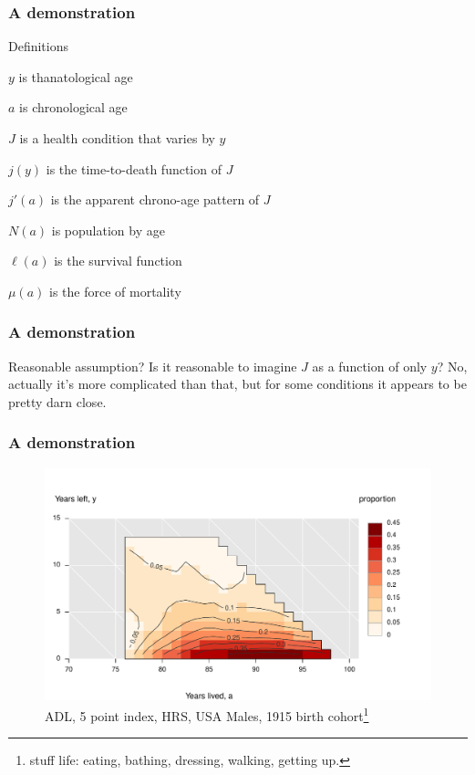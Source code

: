 \documentclass[20pt]{beamer}
\begin{document}
\begin{frame}
\frametitle{A demonstration}
\begin{block}{Definitions}
\begin{description}
\item{$y$} is thanatological age 
\item{$a$} is chronological age 
\item{$J$} is a health condition that varies by $y$~~~\footnotemark
\item{$j(y)$} is the time-to-death function of $J$
\item{$j'(a)$} is the apparent chrono-age pattern of $J$
\item{$N(a)$} is population by age
\item{$\ell(a)$} is the survival function
\item{$\mu(a)$} is the force of mortality
\end{description}
\end{block}
\end{frame}

\begin{frame}
\frametitle{A demonstration}
\begin{block}{Reasonable assumption?}
Is it reasonable to imagine $J$ as a function of only $y$? No, actually it's
more complicated than that, but for some conditions it appears to be pretty darn
close.
\end{block}
\end{frame}

\begin{frame}
\frametitle{A demonstration}
\begin{figure}[b]
    \centering
    \caption{ADL, 5 point index, HRS, USA Males, 1915 birth cohort\footnote{stuff life: eating, bathing, dressing, walking, getting
    up.}}
    \vspace{-3em}
    \includegraphics[scale=1.2]{Figures/SurfExample.pdf}
\end{figure} 
\end{frame}
\end{document}
